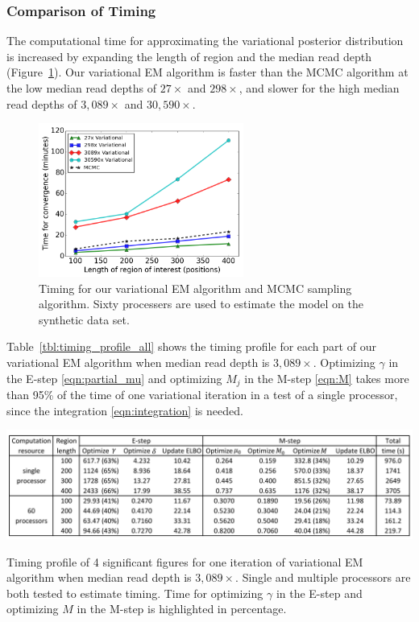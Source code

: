 \documentclass[11pt,reqno]{amsart}
\begin{document}
\subsubsection{Comparison of Timing}
The computational time for approximating the variational posterior distribution is increased by expanding the length of region and the median read depth (Figure~\ref{tbl:timing_mcmc_var}).
Our variational EM algorithm is faster than the MCMC algorithm at the low median read depths of $27\times$ and $298\times$, and slower for the high median read depths of $3,089\times$ and $30,590\times$.
\begin{figure}[ht]
\centering
\includegraphics[width=0.6\textwidth]{figs/timing_var_mcmc.png}
\caption{Timing for our variational EM algorithm and MCMC sampling algorithm.
Sixty processers are used to estimate the model on the synthetic data set.}
\label{tbl:timing_mcmc_var}
\end{figure}

Table~\ref{tbl:timing_profile_all} shows the timing profile for each part of our variational EM algorithm when median read depth is $3,089\times$.
Optimizing $\gamma$ in the E-step \eqref{eqn:partial_mu} and optimizing $M_j$ in the M-step \eqref{eqn:M} takes more than 95\% of the time of one variational iteration in a test of a single processor, since the integration \eqref{eqn:integration} is needed.
\begin{table}[htbp]
\centering
\includegraphics[width=1.0\textwidth]{tables/time_3089X_all_update.png}
\caption{Timing profile of 4 significant figures for one iteration of variational EM algorithm when median read depth is $3,089\times$.
Single and multiple processors are both tested to estimate timing. Time for optimizing $\gamma$ in the E-step and optimizing $M$ in the M-step is highlighted in percentage.}
\label{tbl:timing_profile_all}
\end{table}
\end{document}
